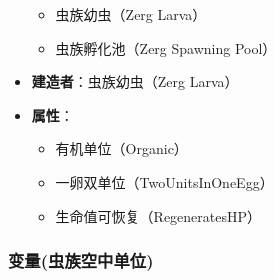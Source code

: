 \begin{tcolorbox}[colback=white, colframe=black!60!white, title=Zerg\_Zergling(), arc=0mm]
\begin{itemize}
            \begin{itemize}
                \item 虫族幼虫（Zerg Larva）
                \item 虫族孵化池（Zerg Spawning Pool）
            \end{itemize}
        \item \textbf{建造者}：虫族幼虫（Zerg Larva）
        \item \textbf{属性}：
            \begin{itemize}
                \item 有机单位（Organic）
                \item 一卵双单位（TwoUnitsInOneEgg）
                \item 生命值可恢复（RegeneratesHP）
            \end{itemize}
    \end{itemize}
\end{tcolorbox}

\subsubsection{变量(虫族空中单位)}

